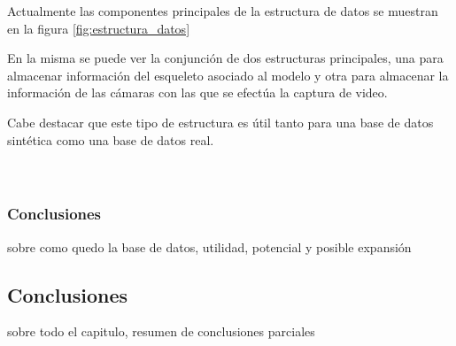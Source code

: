 Actualmente las componentes principales de la estructura de datos se muestran en la figura \ref{fig:estructura_datos}

En la misma se puede ver la conjunción de dos estructuras principales, una para almacenar información del esqueleto asociado al modelo y otra para almacenar la información de las cámaras con las que se efectúa la captura de video.

Cabe destacar que este tipo de estructura es útil tanto para una base de datos sintética como una base de datos real. \\
\\
\\
\subsubsection{Conclusiones}
sobre como quedo la base de datos, utilidad, potencial y posible expansión

\subsection{Conclusiones}
sobre todo el capitulo, resumen de conclusiones parciales



